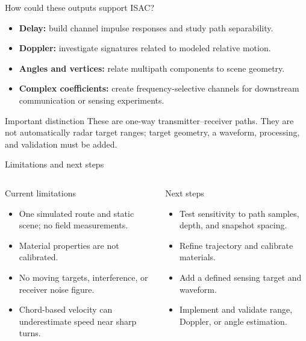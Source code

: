 \documentclass[aspectratio=169,10pt]{beamer}
\begin{document}
\begin{frame}{How could these outputs support ISAC?}
\begin{itemize}\setlength\itemsep{9pt}
\item \textbf{Delay:} build channel impulse responses and study path separability.
\item \textbf{Doppler:} investigate signatures related to modeled relative motion.
\item \textbf{Angles and vertices:} relate multipath components to scene geometry.
\item \textbf{Complex coefficients:} create frequency-selective channels for downstream communication or sensing experiments.
\end{itemize}
\vspace{5pt}
\begin{alertblock}{Important distinction}
These are one-way transmitter--receiver paths. They are not automatically radar target ranges; target geometry, a waveform, processing, and validation must be added.
\end{alertblock}
\end{frame}

\begin{frame}{Limitations and next steps}
\begin{columns}[T,onlytextwidth]
\begin{block}{Current limitations}
\begin{itemize}\setlength\itemsep{5pt}
\item One simulated route and static scene; no field measurements.
\item Material properties are not calibrated.
\item No moving targets, interference, or receiver noise figure.
\item Chord-based velocity can underestimate speed near sharp turns.
\end{itemize}
\end{block}
\begin{block}{Next steps}
\begin{itemize}\setlength\itemsep{5pt}
\item Test sensitivity to path samples, depth, and snapshot spacing.
\item Refine trajectory and calibrate materials.
\item Add a defined sensing target and waveform.
\item Implement and validate range, Doppler, or angle estimation.
\end{itemize}
\end{block}
\end{columns}
\end{frame}
\end{document}
